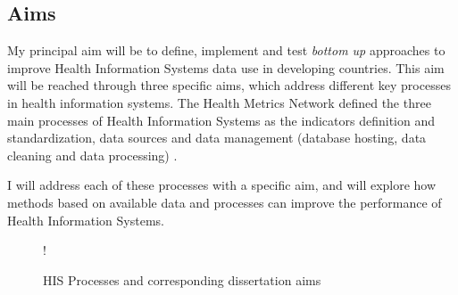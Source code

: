 \subsection{Aims}

My principal aim will be to define, implement and test \textit{bottom up} approaches to improve Health Information Systems data use in developing countries. This aim will be reached through three specific aims, which address different key processes in health information systems. The Health Metrics Network defined the three main processes of Health Information Systems as the indicators definition and standardization, data sources and data management (database hosting, data cleaning and data processing) \citep{health_metrics_network_framework_2008}.

I will address each of these processes with a specific aim, and will explore how methods based on available data and processes can improve the performance of Health Information Systems.

\begin{center}
 \begin {figure}[ht]
        \centering
\resizebox{\linewidth} {!} {

}
\caption{HIS Processes and corresponding dissertation aims}
\label{fig:process_aim}
\end{figure}
\end{center}


